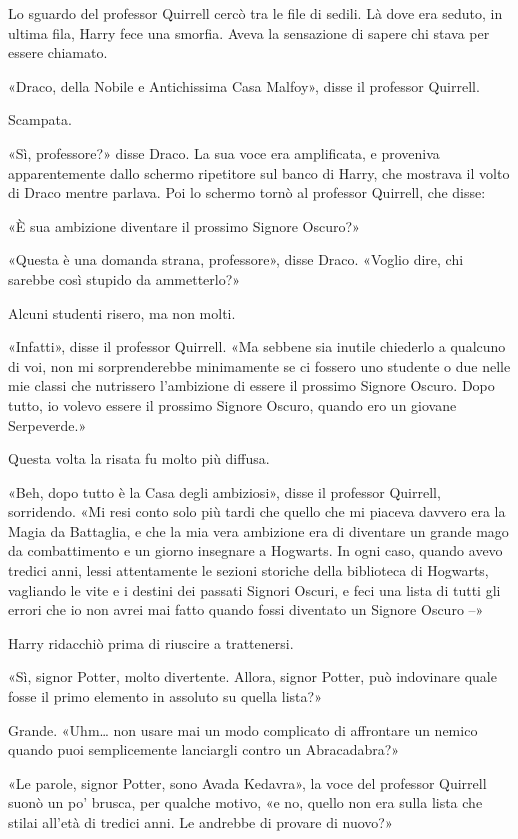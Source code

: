 Lo sguardo del professor Quirrell cercò tra le file di sedili. Là dove era seduto, in ultima fila, Harry fece una smorfia. Aveva la sensazione di sapere chi stava per essere chiamato.

«Draco, della Nobile e Antichissima Casa Malfoy», disse il professor Quirrell.

Scampata.

«Sì, professore?» disse Draco. La sua voce era amplificata, e proveniva apparentemente dallo schermo ripetitore sul banco di Harry, che mostrava il volto di Draco mentre parlava. Poi lo schermo tornò al professor Quirrell, che disse:

«È sua ambizione diventare il prossimo Signore Oscuro?»

«Questa è una domanda strana, professore», disse Draco. «Voglio dire, chi sarebbe così stupido da ammetterlo?»

Alcuni studenti risero, ma non molti.

«Infatti», disse il professor Quirrell. «Ma sebbene sia inutile chiederlo a qualcuno di voi, non mi sorprenderebbe minimamente se ci fossero uno studente o due nelle mie classi che nutrissero l’ambizione di essere il prossimo Signore Oscuro. Dopo tutto, io volevo essere il prossimo Signore Oscuro, quando ero un giovane Serpeverde.»

Questa volta la risata fu molto più diffusa.

«Beh, dopo tutto è la Casa degli ambiziosi», disse il professor Quirrell, sorridendo. «Mi resi conto solo più tardi che quello che mi piaceva davvero era la Magia da Battaglia, e che la mia vera ambizione era di diventare un grande mago da combattimento e un giorno insegnare a Hogwarts. In ogni caso, quando avevo tredici anni, lessi attentamente le sezioni storiche della biblioteca di Hogwarts, vagliando le vite e i destini dei passati Signori Oscuri, e feci una lista di tutti gli errori che io non avrei mai fatto quando fossi diventato un Signore Oscuro –»

Harry ridacchiò prima di riuscire a trattenersi.

«Sì, signor Potter, molto divertente. Allora, signor Potter, può indovinare quale fosse il primo elemento in assoluto su quella lista?»

Grande. «Uhm… non usare mai un modo complicato di affrontare un nemico quando puoi semplicemente lanciargli contro un Abracadabra?»

«Le parole, signor Potter, sono Avada Kedavra», la voce del professor Quirrell suonò un po’ brusca, per qualche motivo, «e no, quello non era sulla lista che stilai all’età di tredici anni. Le andrebbe di provare di nuovo?»

